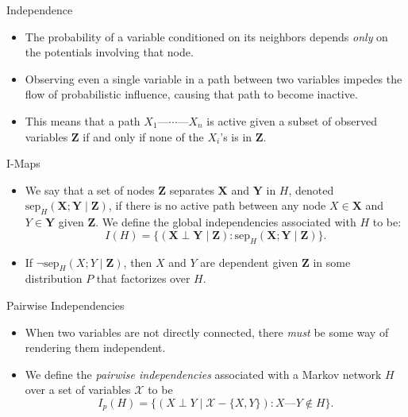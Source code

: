 \documentclass[11pt]{beamer}
\begin{document}
\begin{frame}{Independence \cite{pgmslides}}
\begin{itemize}
	\item The probability of a variable conditioned on its neighbors
	depends \emph{only} on the potentials involving that node.
	\item Observing even a single variable in a path between two variables
	impedes the flow of probabilistic influence, causing that path to become
	inactive.
	\item This means that a path $X_{1} \text{---} \cdots \text{---} X_{n}$
	is active given a subset of observed variables $\boldsymbol{Z}$ if and
	only if none of the $X_{i}$'s is in $\boldsymbol{Z}$.
\end{itemize}
\end{frame}

\begin{frame}{I-Maps}
\begin{itemize}
	\item We say that a set of nodes $\boldsymbol{Z}$ separates
	$\boldsymbol{X}$ and $\boldsymbol{Y}$ in $H$, denoted
	$\text{sep}_{H}(\boldsymbol{X};\boldsymbol{Y}\;|\;\boldsymbol{Z})$, if
	there is no active path between any node $X \in \boldsymbol{X}$ and $Y
	\in \boldsymbol{Y}$ given $\boldsymbol{Z}$. We define the global
	independencies associated with $H$ to be:
	\[
		I(H) = \{(\boldsymbol{X} \perp \boldsymbol{Y} \;|\;
		\boldsymbol{Z}) : \text{sep}_{H}(\boldsymbol{X};
		\boldsymbol{Y} \;|\; \boldsymbol{Z})\}.
	\]
	\item If $\neg\text{sep}_{H}(X ; Y \;|\; \boldsymbol{Z})$, then $X$ and
	$Y$ are dependent given $\boldsymbol{Z}$ in some distribution $P$ that
	factorizes over $H$.
\end{itemize}
\end{frame}

\begin{frame}{Pairwise Independencies}
\begin{itemize}
	\item When two variables are not directly connected, there \emph{must}
	be some way of rendering them independent.
	\item We define the \emph{pairwise independencies} associated with a
	Markov network $H$ over a set of variables $\mathcal{X}$ to be
	\[
		I_{p}(H) = \{(X \perp Y \;|\; \mathcal{X} - \{X,Y\}) : X
		\text{---} Y \notin H\}.
	\]
\end{itemize}
\end{frame}
\end{document}
